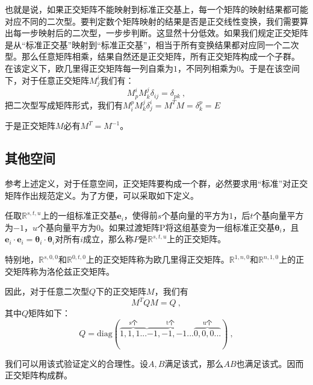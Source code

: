 也就是说，如果正交矩阵不能映射到标准正交基上，每一个矩阵的映射结果都可能对应不同的二次型。要判定数个矩阵映射的结果是否是正交线性变换，我们需要算出每一步映射后的二次型，一步步判断。这显然十分低效。如果我们规定正交矩阵是从“标准正交基”映射到“标准正交基”，相当于所有变换结果都对应同一个二次型。那么任意矩阵相乘，结果自然还是正交矩阵，所有正交矩阵构成一个子群。
在该定义下，欧几里得正交矩阵每一列自乘为$1$，不同列相乘为$0$。于是在该空间下，对于任意正交矩阵$M^i_j$我们有：
\begin{equation}
M^i_pM^j_k\delta_{ij}=\delta_{pk}~,
\end{equation}
把二次型写成矩阵形式，我们有$M^p_iM^j_k\delta^i_j=M^T M=\delta^p_k=E$

于是正交矩阵$M$必有$M^T=M^{-1}$。
\subsection{其他空间}
参考上述定义，对于任意空间，正交矩阵要构成一个群，必然要求用“标准”对正交矩阵作出规范定义。为了方便，可以采取如下定义。
\begin{definition}{}
任取$\mathbb R^{s,t,u}$上的一组标准正交基${\boldsymbol{e}_i}$，使得前$s$个基向量的平方为$1$，后$t$个基向量平方为$-1$，$u$个基向量平方为$0$。如果过渡矩阵P将这组基变为一组标准正交基${\boldsymbol{\theta}_i}$，且$\boldsymbol{e}_i\cdot \boldsymbol{e}_i=\boldsymbol{\theta}_i\cdot\boldsymbol{\theta}_i$对所有$i$成立，那么称$P$是$\mathbb R^{s,t,u}$上的正交矩阵。

特别地，$\mathbb R^{s,0,0}$和$\mathbb R^{0,t,0}$上的正交矩阵称为欧几里得正交矩阵。$\mathbb R^{1,n,0}$和$\mathbb R^{n,1,0}$上的正交矩阵称为洛伦兹正交矩阵。
\end{definition}
因此，对于任意二次型$Q$下的正交矩阵$M$，我们有
\begin{equation}
M^TQM=Q~,
\end{equation}
其中$Q$矩阵如下：
\begin{equation}
Q=\mathrm{diag}(\overbrace{1,1,1...}^{\text{s个}}\overbrace{-1,-1,-1...}^{\text{t个}}\overbrace{0,0,0...}^{\text{u个}})~,
\end{equation}

我们可以用该式验证定义的合理性。设$A,B$满足该式，那么$AB$也满足该式。因而正交矩阵构成群。